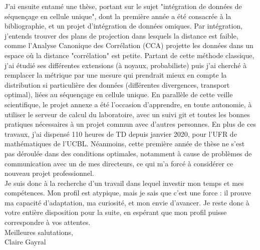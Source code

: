 \documentclass[a4paper,12pt]{article}
\begin{document}
J'ai ensuite entamé une thèse, portant sur le sujet "intégration de données de séquençage en cellule unique", dont la première année a été consacrée à la bibliographie, et un projet d'intégration de données omiques. 
%
Par intégration, j'entends trouver des plans de projection dans lesquels la distance est faible, comme l'Analyse Canonique des Corrélation (CCA) projette les données dans un espace où la distance "corrélation" est petite. Partant de cette méthode classique, j'ai étudié ses différentes extensions (à noyaux, probabiliste) puis j'ai cherché à remplacer la métrique par une mesure qui prendrait mieux en compte la distribution si particulière des données (différentes divergences, transport optimal), liées au séquençage en cellule unique. 
En parallèle de cette veille scientifique, le projet annexe a été l'occasion d'apprendre, en toute autonomie, à utiliser le serveur de calcul du laboratoire, avec un suivi git et toutes les bonnes pratiques nécessaires à un projet commun avec d'autres personnes.
En plus de ces travaux, j'ai dispensé 110 heures de TD depuis janvier 2020, pour l'UFR de mathématiques de l'UCBL. 
Néanmoins, cette première année de thèse ne s'est pas déroulée dans des conditions optimales, notamment à cause de problèmes de communication avec un de mes directeurs, ce qui m'a forcé à considérer ce nouveau projet professionnel.\\ 

Je suis donc à la recherche d'un travail dans lequel investir mon temps et mes compétences. Mon profil est atypique, mais je sais que c'est une force : il prouve ma capacité d'adaptation, ma curiosité, et mon envie d'avancer. 
%
Je reste donc à votre entière disposition pour la suite, en espérant que mon profil puisse correspondre à vos attentes. \\

Meilleures salutations, \\

Claire Gayral
\end{document}
